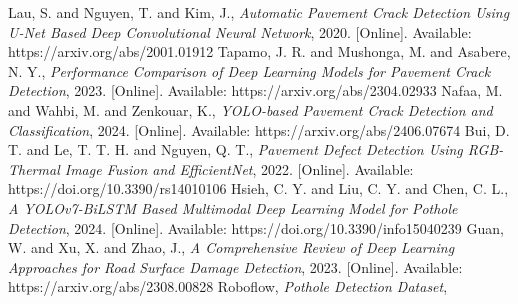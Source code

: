 \documentclass[conference]{IEEEtran}
\begin{document}
\begin{thebibliography}{99}
 Lau, S. and Nguyen, T. and Kim, J., \textit{Automatic Pavement Crack Detection Using U-Net Based Deep Convolutional Neural Network}, 2020. [Online]. Available: https://arxiv.org/abs/2001.01912
 Tapamo, J. R. and Mushonga, M. and Asabere, N. Y., \textit{Performance Comparison of Deep Learning Models for Pavement Crack Detection}, 2023. [Online]. Available: https://arxiv.org/abs/2304.02933
 Nafaa, M. and Wahbi, M. and Zenkouar, K., \textit{YOLO-based Pavement Crack Detection and Classification}, 2024. [Online]. Available: https://arxiv.org/abs/2406.07674
 Bui, D. T. and Le, T. T. H. and Nguyen, Q. T., \textit{Pavement Defect Detection Using RGB-Thermal Image Fusion and EfficientNet}, 2022. [Online]. Available: https://doi.org/10.3390/rs14010106
 Hsieh, C. Y. and Liu, C. Y. and Chen, C. L., \textit{A YOLOv7-BiLSTM Based Multimodal Deep Learning Model for Pothole Detection}, 2024. [Online]. Available: https://doi.org/10.3390/info15040239
 Guan, W. and Xu, X. and Zhao, J., \textit{A Comprehensive Review of Deep Learning Approaches for Road Surface Damage Detection}, 2023. [Online]. Available: https://arxiv.org/abs/2308.00828
 Roboflow, \textit{Pothole Detection Dataset}, 
\end{thebibliography}

\end{document}
